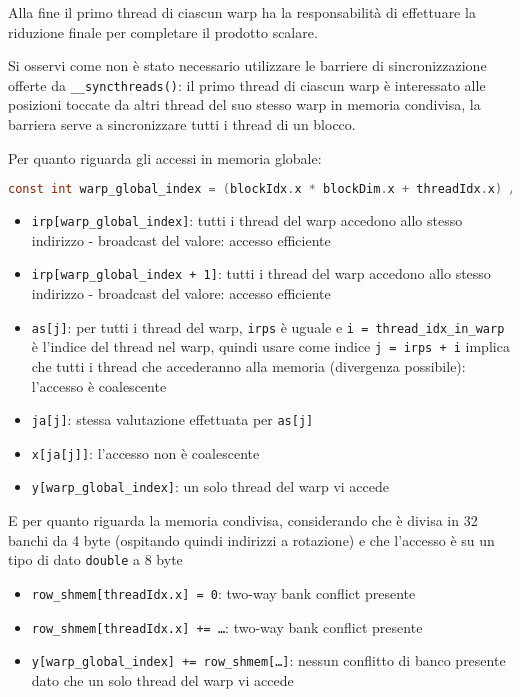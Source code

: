 \documentclass[9pt]{extarticle}
\begin{document}
Alla fine il primo thread di ciascun warp ha la responsabilità di effettuare la riduzione finale per completare il 
prodotto scalare.

Si osservi come non è stato necessario utilizzare le barriere di sincronizzazione offerte da \texttt{\_\_syncthreads()}:
il primo thread di ciascun warp è interessato alle posizioni toccate da altri thread del suo stesso warp
in memoria condivisa, la barriera serve a sincronizzare tutti i thread di un blocco.

Per quanto riguarda gli accessi in memoria globale:

\begin{lstlisting}[language=C]
const int warp_global_index = (blockIdx.x * blockDim.x + threadIdx.x) / warpSize;
\end{lstlisting}

\begin{itemize}
	\item \texttt{irp[warp\_global\_index]}: tutti i thread del warp accedono allo stesso indirizzo - broadcast del valore: accesso efficiente
	\item \texttt{irp[warp\_global\_index + 1]}: tutti i thread del warp accedono allo stesso indirizzo - broadcast del valore: accesso efficiente
	\item \texttt{as[j]}: per tutti i thread del warp, \texttt{irps} è uguale e \texttt{i = thread\_idx\_in\_warp} è l'indice del thread nel
	warp, quindi usare come indice \texttt{j = irps + i} implica che tutti i thread che accederanno alla memoria (divergenza possibile): l'accesso è coalescente
	\item \texttt{ja[j]}: stessa valutazione effettuata per \texttt{as[j]}
	\item \texttt{x[ja[j]]}: l'accesso non è coalescente
	\item \texttt{y[warp\_global\_index]}: un solo thread del warp vi accede
\end{itemize}

E per quanto riguarda la memoria condivisa, considerando che è divisa in 32 banchi da 4 byte (ospitando quindi indirizzi
a rotazione) e che l'accesso è su un tipo di dato \texttt{double} a 8 byte

\begin{itemize}
	\item \texttt{row\_shmem[threadIdx.x] = 0}: two-way bank conflict presente
	\item \texttt{row\_shmem[threadIdx.x] += \dots}: two-way bank conflict presente
	\item \texttt{y[warp\_global\_index] += row\_shmem[\dots]}: nessun conflitto di banco presente dato che un
	solo thread del warp vi accede
\end{itemize}
\end{document}
